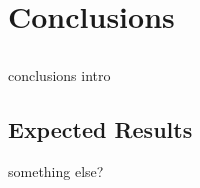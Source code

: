 \chapter{Conclusions} \label{chap:concl}

\section*{}

conclusions intro

\section{Expected Results}


\vspace*{12mm}

something else?